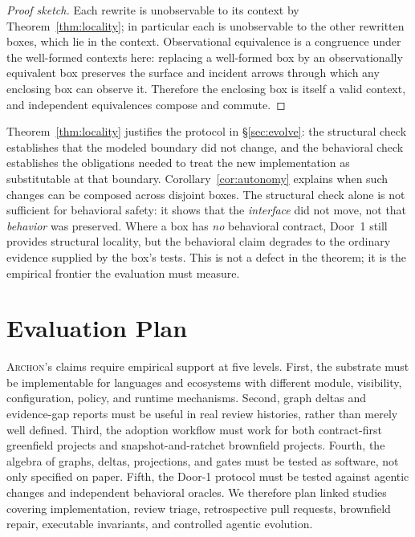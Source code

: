 \documentclass[sigconf,review,anonymous]{acmart}
\theoremstyle{plain}
\theoremstyle{definition}
\begin{document}
\begin{proof}[Proof sketch]
Each rewrite is unobservable to its context by Theorem~\ref{thm:locality}; in
particular each is unobservable to the other rewritten boxes, which lie in the
context. Observational equivalence is a congruence under the well-formed
contexts here: replacing a well-formed box by an observationally equivalent box
preserves the surface and incident arrows through which any enclosing box can
observe it. Therefore the enclosing box is itself a valid context, and
independent equivalences compose and commute.
\end{proof}

\noindent
Theorem~\ref{thm:locality} justifies the protocol in \S\ref{sec:evolve}: the
structural check establishes that the modeled boundary did not change, and the
behavioral check establishes the obligations needed to treat the new
implementation as substitutable at that boundary.
Corollary~\ref{cor:autonomy} explains when such changes can be composed across
disjoint boxes. The structural check alone is not sufficient for behavioral
safety: it shows that the \emph{interface} did not move, not that
\emph{behavior} was preserved. Where a box has \emph{no} behavioral contract,
Door~1 still provides structural locality, but the behavioral claim degrades to
the ordinary evidence supplied by the box's tests. This is not a defect in the
theorem; it is the empirical frontier the evaluation must measure.

\section{Evaluation Plan}\label{sec:eval}

\textsc{Archon}'s claims require empirical support at five levels. First, the substrate
must be implementable for languages and ecosystems with different module,
visibility, configuration, policy, and runtime mechanisms. Second, graph deltas
and evidence-gap reports must be useful in real review histories, rather than
merely well defined. Third, the adoption workflow must work for both
contract-first greenfield projects and snapshot-and-ratchet brownfield projects.
Fourth, the algebra of graphs, deltas, projections, and gates must be tested as
software, not only specified on paper. Fifth, the Door-1 protocol must be tested
against agentic changes and independent behavioral oracles. We therefore plan
linked studies covering implementation, review triage, retrospective pull
requests, brownfield repair, executable invariants, and controlled agentic
evolution.
\end{document}

